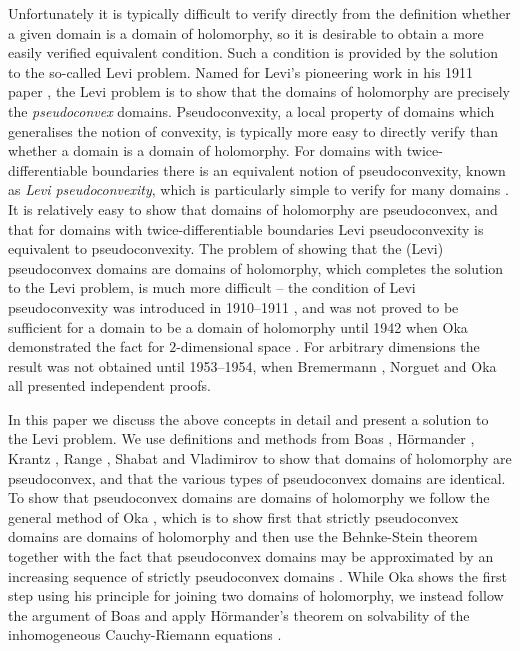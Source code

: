 \documentclass[11pt,a4paper, final, twoside]{article}
\numberwithin{equation}{section}
\begin{document}
Unfortunately it is typically difficult to verify directly from the definition whether a given domain is a domain of holomorphy, so it is desirable to obtain a more easily verified equivalent condition.
Such a condition is provided by the solution to the so-called Levi problem. Named for Levi's pioneering work in his 1911 paper \cite{levi11}, the Levi problem
is to show that the domains of holomorphy are precisely the \emph{pseudoconvex} domains. Pseudoconvexity, a local property of domains
which generalises the notion of convexity, is typically more easy to directly verify than whether a domain is a domain of holomorphy.
For domains with twice-differentiable boundaries there is an equivalent notion of pseudoconvexity, known as \emph{Levi pseudoconvexity}, which is particularly simple to verify for many
domains \cite{levi,levi11}.
It is relatively easy to show that domains of holomorphy are pseudoconvex, and that for domains with twice-differentiable boundaries Levi pseudoconvexity
is equivalent to pseudoconvexity. The problem of showing that the
(Levi) pseudoconvex domains are domains of holomorphy, which completes the solution to the Levi problem, is much more difficult -- the condition of Levi pseudoconvexity was introduced in 1910--1911 \cite{levi,levi11}, and 
was not proved
to be sufficient for a domain to be a domain of holomorphy until 1942 when Oka demonstrated the fact for $2$-dimensional space \cite{oka42}. For arbitrary dimensions 
the result was not obtained until 1953--1954, when Bremermann \cite{bremermann}, Norguet \cite{norguet} and Oka \cite{oka}  all presented independent proofs.

In this paper we discuss the above concepts in detail and present
a solution to the Levi problem.
We use definitions and methods from Boas \cite{boas}, H\"ormander \cite{hormanderbook}, Krantz \cite{krantz}, Range \cite{range}, Shabat \cite{itca} and Vladimirov \cite{vlad}
to show that domains of holomorphy are pseudoconvex, and that the various types of pseudoconvex domains are identical. To show that pseudoconvex domains are domains of holomorphy we follow the general method
of Oka \cite{oka}, which is to show first that strictly pseudoconvex domains are domains of holomorphy 
and then use the Behnke-Stein theorem \cite{behnkestein} together with the fact that pseudoconvex domains may be approximated
by an increasing sequence of strictly pseudoconvex domains \cite{lelong,oka}. 
While Oka shows the first step using his principle for joining two domains of holomorphy, we instead follow the argument of Boas \cite{boas} and apply
H\"ormander's theorem on solvability of the inhomogeneous Cauchy-Riemann equations \cite{hormander}. 
\end{document}
